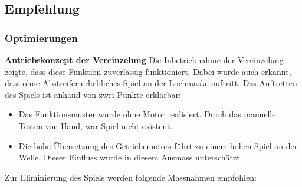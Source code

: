 \subsection{Empfehlung}

\subsubsection{Optimierungen}

\textbf{Antriebskonzept der Vereinzelung}
\newline
Die Inbetriebnahme der Vereinzelung zeigte, dass diese Funktion zuverlässig funktioniert. Dabei wurde auch erkannt, dass ohne Abstreifer erhebliches Spiel an der Lochmaske auftritt. Das Auftretten des Spiels ist anhand von zwei Punkte erklärbar:
\begin{itemize}
	\item Das Funktionsmuster wurde ohne Motor realisiert. Durch das manuelle Testen von Hand, war Spiel nicht existent.
	
	\item Die hohe Übersetzung des Getriebemotors führt zu einem hohen Spiel an der Welle. Dieser Einfluss wurde in diesem Ausmass unterschätzt.
\end{itemize}

Zur Eliminierung des Spiels werden folgende Massnahmen empfohlen:

